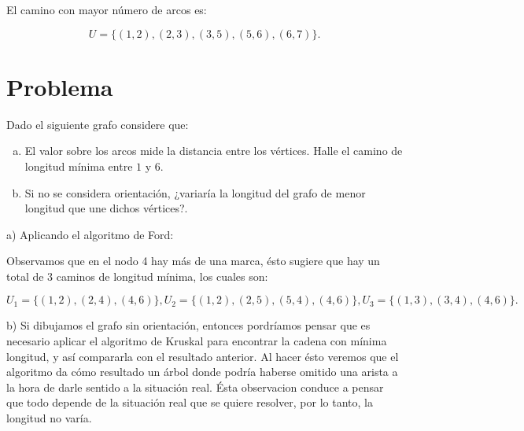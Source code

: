\documentclass[autocontact]{gaceta}
\begin{document}
    
    \pagebreak
    El camino con mayor número de arcos es:
    \begin{center}
        \begin{equation}
            U = \{ (1,2), (2,3), (3,5), (5,6), (6,7) \}.
        \end{equation}        
    \end{center}

\section{Problema}
    Dado el siguiente grafo considere que:
    \begin{center}
        \begin{enumerate}[a)]
            \item El valor sobre los arcos mide la distancia  entre los vértices. Halle el camino 
                de longitud mínima entre $1$ y $6$.
            \item Si no se considera orientación, ¿variaría la longitud del grafo de menor longitud
                que une dichos vértices?.
        \end{enumerate}        
    \end{center}

    
    \pagebreak
    a) Aplicando el algoritmo de Ford:

    
    Observamos que en el nodo 4 hay más de una marca, ésto sugiere que hay un total de 3 caminos de
    longitud mínima, los cuales son:
    \begin{center}
        \begin{equation}
            U_1 = \{(1,2), (2,4), (4,6)\}, U_2 = \{(1,2), (2,5), (5,4), (4,6)\}, U_3 = \{(1,3), (3,4), (4,6)\}.            
        \end{equation}
    \end{center}

    b) Si dibujamos el grafo sin orientación, entonces pordríamos pensar que es necesario aplicar el 
    algoritmo de Kruskal para encontrar la cadena con mínima longitud, y así compararla con el 
    resultado anterior. Al hacer ésto veremos que el algoritmo da cómo resultado un árbol 
    donde podría haberse omitido una arista a la hora de darle sentido 
    a la situación real. Ésta observacion conduce a pensar que todo depende de la situación real que 
    se quiere resolver, por lo tanto, la longitud no varía. 
    
\end{document}
